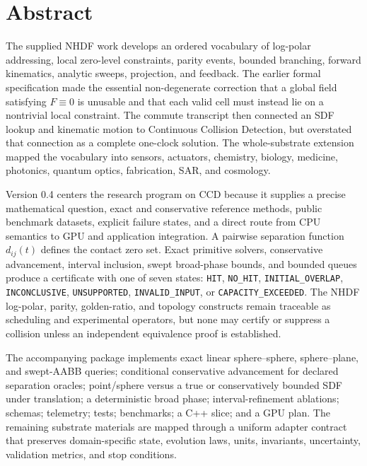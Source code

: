 \documentclass[11pt,a4paper,openany]{book}
\newcommand{\status}[1]{\texttt{#1}}
\newcommand{\sepfn}{d_{ij}}
\begin{document}
\chapter*{Abstract}
The supplied NHDF work develops an ordered vocabulary of log-polar addressing, local zero-level constraints, parity events, bounded branching, forward kinematics, analytic sweeps, projection, and feedback. The earlier formal specification made the essential non-degenerate correction that a global field satisfying $F\equiv 0$ is unusable and that each valid cell must instead lie on a nontrivial local constraint. The commute transcript then connected an SDF lookup and kinematic motion to Continuous Collision Detection, but overstated that connection as a complete one-clock solution. The whole-substrate extension mapped the vocabulary into sensors, actuators, chemistry, biology, medicine, photonics, quantum optics, fabrication, SAR, and cosmology.

Version 0.4 centers the research program on CCD because it supplies a precise mathematical question, exact and conservative reference methods, public benchmark datasets, explicit failure states, and a direct route from CPU semantics to GPU and application integration. A pairwise separation function $\sepfn(t)$ defines the contact zero set. Exact primitive solvers, conservative advancement, interval inclusion, swept broad-phase bounds, and bounded queues produce a certificate with one of seven states: \status{HIT}, \status{NO\_HIT}, \status{INITIAL\_OVERLAP}, \status{INCONCLUSIVE}, \status{UNSUPPORTED}, \status{INVALID\_INPUT}, or \status{CAPACITY\_EXCEEDED}. The NHDF log-polar, parity, golden-ratio, and topology constructs remain traceable as scheduling and experimental operators, but none may certify or suppress a collision unless an independent equivalence proof is established.

The accompanying package implements exact linear sphere--sphere, sphere--plane, and swept-AABB queries; conditional conservative advancement for declared separation oracles; point/sphere versus a true or conservatively bounded SDF under translation; a deterministic broad phase; interval-refinement ablations; schemas; telemetry; tests; benchmarks; a C++ slice; and a GPU plan. The remaining substrate materials are mapped through a uniform adapter contract that preserves domain-specific state, evolution laws, units, invariants, uncertainty, validation metrics, and stop conditions.
\end{document}
